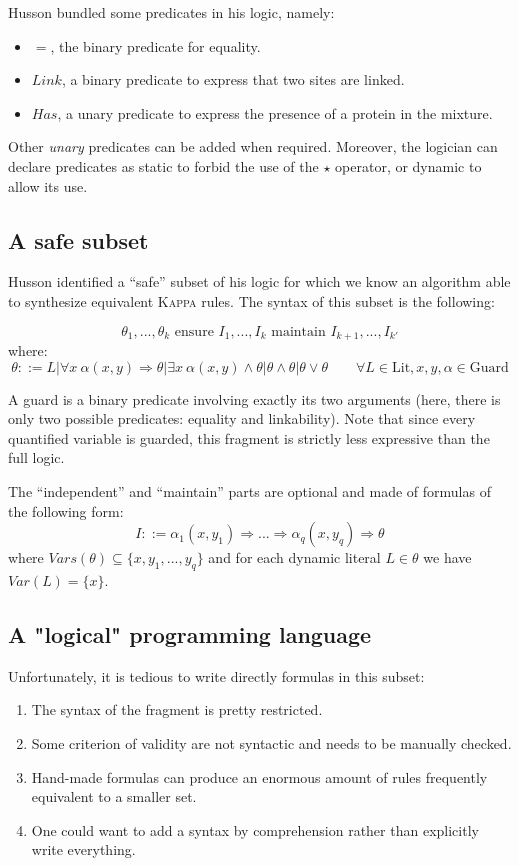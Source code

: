 \documentclass[10pt,a4paper]{article}
\newcommand\Kappa{\textsc{Kappa}}
\begin{document}
Husson bundled some predicates in his logic, namely:
\begin{itemize}
\item $=$, the binary predicate for equality.
\item $Link$, a binary predicate to express that two sites are linked.
\item $Has$, a unary predicate to express the presence of a protein in the mixture.
\end{itemize}

Other \emph{unary} predicates can be added when required. Moreover, the logician can declare predicates as static to forbid the use of the $\star$ operator, or dynamic to allow its use.

\subsection{A safe subset}
Husson identified a ``safe'' subset of his logic for which we know an algorithm able to synthesize equivalent \Kappa{} rules. The syntax of this subset is the following\cite{husson}:
\label{hussonsyntax}

$$ \theta_1,... ,\theta_k \text{ ensure } I_1,...,I_k \text{ maintain } I_{k+1},...,I_{k'} $$
where:
$$ \theta ::= L | \forall x\ \alpha(x,y) \Rightarrow \theta | \exists x\ \alpha(x,y) \land \theta | \theta \land \theta | \theta \lor \theta \quad \quad \forall L \in \text{Lit},x,y,\alpha \in \text{Guard}$$

A guard is a binary predicate involving exactly its two arguments (here, there is only two possible predicates: equality and linkability). Note that since every quantified variable is guarded, this fragment is strictly less expressive than the full logic.

The ``independent'' and ``maintain'' parts are optional and made of formulas of the following form:
$$ I ::= \alpha_1(x,y_1) \Rightarrow ...\Rightarrow \alpha_q(x,y_q) \Rightarrow \theta $$
\label{criterion}
where $Vars(\theta) \subseteq \{x,y_1,...,y_q\}$ and for each dynamic literal $L \in \theta$ we have $Var(L) = \{x\}$.

\subsection{A "logical" programming language}
Unfortunately, it is tedious to write directly formulas in this subset:

\begin{enumerate}
\item The syntax of the fragment is pretty restricted.
\item Some criterion of validity are not syntactic and needs to be manually checked.
\item Hand-made formulas can produce an enormous amount of rules frequently equivalent to a smaller set.
\item One could want to add a syntax by comprehension rather than explicitly write everything.
\end{enumerate}
\end{document}
